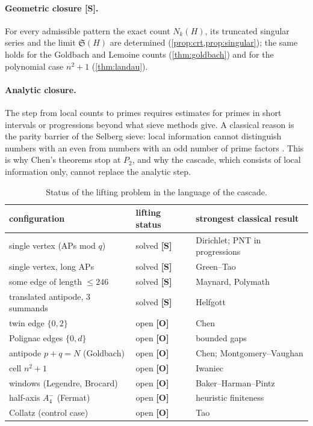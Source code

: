 \documentclass[11pt,a4paper]{article}
\newcommand{\statS}{\textsf{\textbf{[S]}}}
\newcommand{\statO}{\textsf{\textbf{[O]}}}
\theoremstyle{plain}
\theoremstyle{definition}
\theoremstyle{remark}
\begin{document}
\paragraph{Geometric closure \statS.} For every admissible pattern the exact
count $N_k(H)$, its truncated singular series and the limit $\mathfrak S(H)$
are determined (\cref{prop:crt,prop:singular}); the same holds for the
Goldbach and Lemoine counts (\cref{thm:goldbach}) and for the polynomial case
$n^2+1$ (\cref{thm:landau}).

\paragraph{Analytic closure.} The step from local counts to primes requires
estimates for primes in short intervals or progressions beyond what sieve
methods give. A classical reason is the parity barrier of the Selberg sieve:
local information cannot distinguish numbers with an even from numbers with
an odd number of prime factors \cite{FriedlanderIwaniec}. This is why Chen's
theorems stop at $P_2$, and why the cascade, which consists of local
information only, cannot replace the analytic step.

\begin{table}[!htbp]
\centering\small
\caption{Status of the lifting problem in the language of the cascade.}
\label{tab:lifting}
\begin{tabular}{p{5.4cm}p{2.2cm}p{6.2cm}}\toprule
configuration & lifting status & strongest classical result\\\midrule
single vertex (APs mod $q$) & solved \statS & Dirichlet; PNT in progressions\\
single vertex, long APs & solved \statS & Green--Tao \cite{GreenTao}\\
some edge of length $\le246$ & solved \statS & Maynard, Polymath \cite{Maynard,Polymath}\\
translated antipode, 3 summands & solved \statS & Helfgott \cite{Helfgott}\\
twin edge $\{0,2\}$ & open \statO & Chen \cite{Chen}\\
Polignac edges $\{0,d\}$ & open \statO & bounded gaps\\
antipode $p+q=N$ (Goldbach) & open \statO & Chen; Montgomery--Vaughan \cite{MV}\\
cell $n^2+1$ & open \statO & Iwaniec \cite{Iwaniec}\\
windows (Legendre, Brocard) & open \statO & Baker--Harman--Pintz \cite{BHP}\\
half-axis $A_4^-$ (Fermat) & open \statO & heuristic finiteness\\
Collatz (control case) & open \statO & Tao \cite{Tao}\\\bottomrule
\end{tabular}
\end{table}
\end{document}

